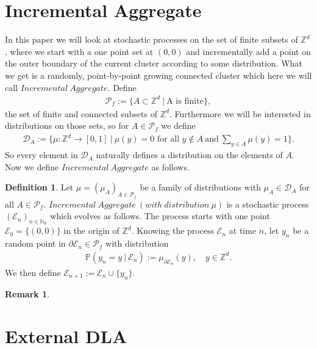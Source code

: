 \documentclass[12pt,a4paper]{scrartcl}
\numberwithin{equation}{section}
\numberwithin{equation}{section}
\theoremstyle{definition}
\newtheorem{definition}{Definition}
\newtheorem{remark}{Remark}
\begin{document}
\section{Incremental Aggregate}
In this paper we will look at stochastic processes on the set of finite subsets of $\mathbb{Z}^d$, where we start with a one point set at $(0,0)$ and incrementally add a point on the outer boundary of the current cluster according to some distribution. What we get is a randomly, point-by-point growing connected cluster which here we will call $\mathit{Incremental\ Aggregate}$. Define 
\begin{align}
	\mathcal{P}_f := \{A\subset \mathbb{Z}^d\ |\ \text{A is finite}\}, 
\end{align}
the set of finite and connected subsets of $\mathbb{Z}^d$. Furthermore we will be interested in distributions on those sets, so for $A\in \mathcal{P}_f$ we define 
\begin{align}
	\mathcal{D}_A:= \{\mu: \mathbb{Z}^d\to [0,1]\ |\ \mu(y) = 0 \text{ for all } y\notin A\ \text{and}\ \sum_{y\in A} \mu(y) = 1 \}.
\end{align}
So every element in $\mathcal{D}_A$ naturally defines a distribution on the elements of $A$. Now we define $\mathit{Incremental\ Aggregate}$ as follows.  

\begin{definition}
	Let $\mu=(\mu_A)_{A\in \mathcal{P}_f}$ be a family of distributions with $\mu_A\in \mathcal{D}_A$ for all $A\in \mathcal{P}_f$. $\mathit{Incremental\ Aggregate\ (with\ distribution\ \mu)}$ is a stochastic process $(\mathcal{E}_n)_{n\in{\mathbb{N}_0}}$ which evolves as follows. The process starts with one point $\mathcal{E}_0 = \{(0,0)\}$ in the origin of $\mathbb{Z}^d$. Knowing the process $\mathcal{E}_n$ at time $n$, let $y_n$ be a random point in $\partial \mathcal{E}_n\in \mathcal{P}_f$ with distribution
	\begin{align}
		\mathbb{P}(y_n = y\ |\ \mathcal{E}_n) := \mu_{\partial \mathcal{E}_n}(y),\quad y\in \mathbb{Z}^d.
	\end{align}
	We then define $\mathcal{E}_{n+1} := \mathcal{E}_n \cup \{y_n\}$.
\end{definition} 

\begin{remark}
	
\end{remark}



\newpage

\newpage
\section{External DLA}
\end{document}
